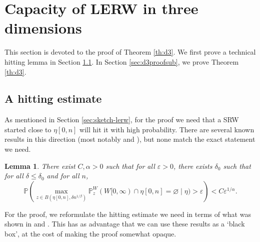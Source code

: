 \documentclass{article}
\renewcommand{\P}{\mathbb{P}}
\newcommand{\1}{\mathbf{1}}
\newtheorem{lemma}[theorem]{Lemma}
\theoremstyle{definition}
\numberwithin{equation}{section}
\numberwithin{theorem}{section}
\begin{document}
\section{Capacity of LERW in three dimensions}\label{sec:d3proof}
This section is devoted to the proof of Theorem \ref{th:d3}. We first prove a technical hitting lemma in Section \ref{sec:hittinglemma}. In Section \ref{sec:d3proofsub}, we  prove Theorem \ref{th:d3}.
\subsection{A hitting estimate}\label{sec:hittinglemma}
As mentioned in Section \ref{sec:sketch-lerw}, for the proof we need that a SRW started close to $\eta[0,n]$ will hit it with high probability. There are several known results in this direction (most notably \cite[Lemma 3.3]{sapozhnikov18brownian} and \cite[Proposition 3.7]{angel21scaling}), but none match the exact statement we need.

\begin{lemma}\label{lemma:hitting3dLERW}
There exist $C,\alpha>0$ such that for all $\varepsilon>0$, there exists $\delta_0$ such that for all $\delta\leq\delta_0$ and for all $n$,
\begin{equation}
    \P\left(\max_{z\in B(\eta[0,n],\delta n^{1/\beta})}\P^W_z(W[0,\infty)\cap \eta[0,n]=\varnothing\mid \eta)>\varepsilon\right)< C\varepsilon^{1/\alpha}.
\end{equation}
\end{lemma}
For the proof, we reformulate the hitting estimate we need in terms of what was shown in \cite[Lemma 3.3]{sapozhnikov18brownian} and \cite[Proposition 3.7]{angel21scaling}. This has as advantage that we can use these results as a `black box', at the cost of making the proof somewhat opaque.
\end{document}
